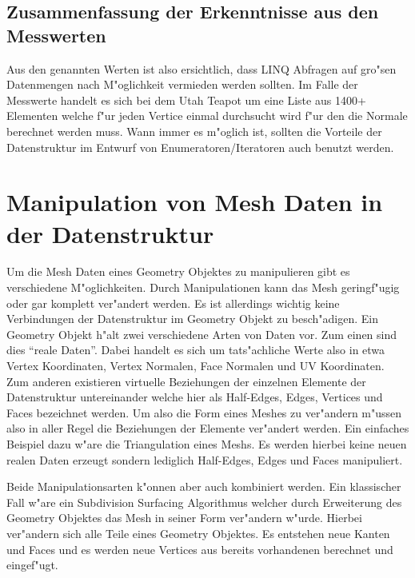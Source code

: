 \documentclass[pagesize, paper=a4, fontsize=12pt,titlepage=true, headings=small, headnosepline, abstractoff, liststotoc, nochapterprefix, plainheadsepline]{scrreprt}
\begin{document}
\subsection{Zusammenfassung der Erkenntnisse aus den Messwerten}
Aus den genannten Werten ist also ersichtlich, dass LINQ Abfragen auf gro"sen Datenmengen nach M"oglichkeit vermieden werden sollten. Im Falle der Messwerte handelt es sich bei dem Utah Teapot um eine Liste aus 1400+ Elementen welche f"ur jeden Vertice einmal durchsucht wird f"ur den die Normale berechnet werden muss. Wann immer es m"oglich ist, sollten die Vorteile der Datenstruktur im Entwurf von Enumeratoren/Iteratoren auch benutzt werden.


	\section {Manipulation von Mesh Daten in der Datenstruktur}
		Um die Mesh Daten eines Geometry Objektes zu manipulieren gibt es verschiedene M"oglichkeiten. Durch Manipulationen kann das Mesh geringf"ugig oder gar komplett ver"andert werden. Es ist allerdings wichtig keine Verbindungen der Datenstruktur im Geometry Objekt zu besch"adigen. Ein Geometry Objekt h"alt zwei verschiedene Arten von Daten vor. Zum einen sind dies "`reale Daten"'. Dabei handelt es sich um tats"achliche Werte also in etwa Vertex Koordinaten, Vertex Normalen, Face Normalen und UV Koordinaten. Zum anderen existieren virtuelle Beziehungen der einzelnen Elemente der Datenstruktur untereinander welche hier als Half-Edges, Edges, Vertices und Faces bezeichnet werden. Um also die Form eines Meshes zu ver"andern m"ussen also in aller Regel die Beziehungen der Elemente ver"andert werden. Ein einfaches Beispiel dazu w"are die Triangulation eines Meshs. Es werden hierbei keine neuen realen Daten erzeugt sondern lediglich Half-Edges, Edges und Faces manipuliert.
\newline

Beide Manipulationsarten k"onnen aber auch kombiniert werden. Ein klassischer Fall w"are ein Subdivision Surfacing Algorithmus welcher durch Erweiterung des Geometry Objektes das Mesh in seiner Form ver"andern w"urde. Hierbei ver"andern sich alle Teile eines Geometry Objektes. Es entstehen neue Kanten und Faces und es werden neue Vertices aus bereits vorhandenen berechnet und eingef"ugt. 
\end{document}
